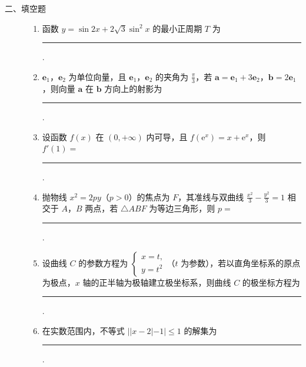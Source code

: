 \begin{description}

    \item[二、填空题]

    \begin{enumerate}[leftmargin=5pt]

      \addtocounter{enumi}{+10}

        \item 函数 \(y = \sin 2x + 2\sqrt{3}\sin^{2}x\) 的最小正周期 \(T\) 为\rule[-0.3ex]{3em}{0.4pt}.

        \item \(\bm{e}_{1}\)，\(\bm{e}_{2}\) 为单位向量，且 \(\bm{e}_{1}\)，\(\bm{e}_{2}\) 的夹角为 \(\frac{\pi}{3}\)，若 \(\bm{a} = \bm{e}_{1} + 3\bm{e}_{2}\)，\(\bm{b} = 2\bm{e}_{1}\)，则向量 \(\bm{a}\) 在 \(\bm{b}\) 方向上的射影为\rule[-0.3ex]{3em}{0.4pt}.

        \item 设函数 \(f(x)\) 在 \((0, +\infty)\) 内可导，且 \(f({\mathrm{e}}^x) = x + {\mathrm{e}}^x\)，则 \(f'(1) =\)\rule[-0.3ex]{3em}{0.4pt}.

        \item 抛物线 \(x^{2} = 2py\)（\(p > 0\)）的焦点为 \(F\)，其准线与双曲线 \(\frac{x^{2}}{3} - \frac{y^{2}}{3} = 1\) 相交于 \(A\)，\(B\) 两点，若 \(\triangle ABF\) 为等边三角形，则 \(p =\)\rule[-0.3ex]{3em}{0.4pt}.

        \item 设曲线 \(C\) 的参数方程为 \(\begin{cases}
x = t,\\
y = t^2
\end{cases}\)（\(t\) 为参数），若以直角坐标系的原点为极点，\(x\) 轴的正半轴为极轴建立极坐标系，则曲线 \(C\) 的极坐标方程为\rule[-0.3ex]{3em}{0.4pt}.

        \item 在实数范围内，不等式 \(||x - 2| - 1| \leqslant 1\) 的解集为\rule[-0.3ex]{3em}{0.4pt}.

    \end{enumerate}

\end{description}

